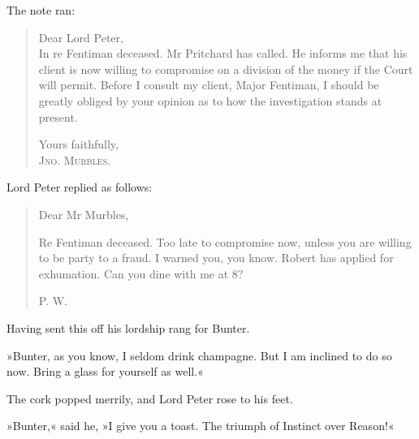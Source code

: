 The note ran:

\begin{samepage}
\begin{quotation}
\noindent Dear Lord Peter,\\
\nopagebreak[4]
\indent In re Fentiman deceased. Mr Pritchard has called. He informs me that his client is now willing to compromise on a division of the money if the Court will permit. Before I consult my client, Major Fentiman, I should be greatly obliged by your opinion as to how the investigation stands at present.
\begin{flushright}
Yours faithfully,\\
\nopagebreak[4]
\textsc{Jno. Murbles.}
\end{flushright}
\end{quotation}
\end{samepage}

Lord Peter replied as follows:
\begin{samepage}
\begin{quotation}
\noindent Dear Mr Murbles,

\indent Re Fentiman deceased. Too late to compromise now, unless you are willing to be party to a fraud. I warned you, you know. Robert has applied for exhumation. Can you dine with me at 8?
\begin{flushright}
\textsc{P. W.}
\end{flushright}
\end{quotation}
\end{samepage}

Having sent this off his lordship rang for Bunter.

»Bunter, as you know, I seldom drink champagne. But I am inclined to do so now. Bring a glass for yourself as well.«

The cork popped merrily, and Lord Peter rose to his feet.

»Bunter,« said he, »I give you a toast. The triumph of Instinct over Reason!«